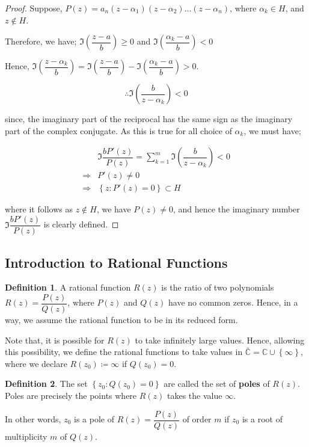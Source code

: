 \documentclass[12pt]{article}
\newcommand{\C}{\mathbb{C}}
\theoremstyle{definition}
\newtheorem{defn}{Definition}
\newenvironment{definition}{
\begin{tcolorbox}[colback=green!5!white,colframe=green!75!black, parbox = false]\begin{defn} }{\end{defn}\end{tcolorbox} }
\begin{document}
\begin{proof}
    Suppose, $P(z) = a_n(z - \alpha_1)(z - \alpha_2)\dots (z - \alpha_n)$, where $\alpha_k \in H$, and $z \notin H$.
    
    Therefore, we have; $\Im \left( \dfrac{z - a}{b} \right) \geq 0$ and $\Im\left( \dfrac{\alpha_k - a}{b} \right) < 0$
    
    Hence, $\Im \left( \dfrac{z - \alpha_k}{b} \right) = \Im\left( \dfrac{z - a}{b} \right) - \Im\left( \dfrac{\alpha_k - a}{b} \right) > 0$. 
    
    $$\therefore \Im\left( \dfrac{b}{z - \alpha_k} \right) < 0$$
    
    since, the imaginary part of the reciprocal has the same sign as the imaginary part of the complex conjugate. As this is true for all choice of $\alpha_k$, we must have;
    
    \begin{align*}
        & \Im \dfrac{b P'(z)}{P(z)} = \sum_{k = 1}^{m} \Im\left( \dfrac{b}{z - \alpha_k} \right) < 0\\
        \Rightarrow & P'(z) \neq 0\\
        \Rightarrow & \left\{ z : P'(z) = 0 \right\} \subset H
    \end{align*}
    
    where it follows as $z \notin H$, we have $P(z) \neq 0$, and hence the imaginary number $\Im \dfrac{b P'(z)}{P(z)}$ is clearly defined.
\end{proof}

\subsection{Introduction to Rational Functions}

\begin{definition}
    A rational function $R(z)$ is the ratio of two polynomials $R(z) = \dfrac{P(z)}{Q(z)}$, where $P(z)$ and $Q(z)$ have no common zeros.
    Hence, in a way, we assume the rational function to be in its reduced form.
\end{definition}

Note that, it is possible for $R(z)$ to take infinitely large values. Hence, allowing this possibility, we define the rational functions to take values in $\bar{\C} = \C \cup \left\{ \infty \right\}$, where we declare $R(z_0)\coloneqq \infty$ if $Q(z_0) = 0$.

\begin{definition}
    The set $\left\{ z_0 : Q(z_0) = 0 \right\}$ are called the set of \textbf{poles} of $R(z)$. Poles are precisely the points where $R(z)$ takes the value $\infty$.
    
    In other words, $z_0$ is a pole of $R(z) = \dfrac{P(z)}{Q(z)}$ of order $m$ if $z_0$ is a root of multiplicity $m$ of $Q(z)$.
\end{definition}
\end{document}
